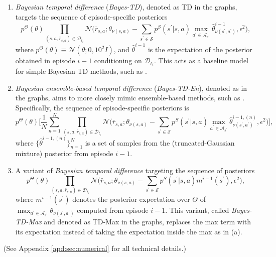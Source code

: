 \documentclass{amsart}
\begin{document}
\begin{enumerate}[label=(\alph*)]
    \item \textit{Bayesian temporal difference} (\textit{Bayes-TD}), denoted as TD in the graphs, targets the sequence of episode-specific posteriors
$$p^\Theta(\theta) \prod_{(s,a,\bar{r}_{s,a}) \in \mathcal{D}_{t_i}} \mathcal{N}\Big(\bar{r}_{s,a};\theta_{\nu(s,a)} - \sum_{s^\prime \in \mathcal{S}} p^S(s^\prime|s,a) \max_{a^\prime \in \mathcal{A}_{s^\prime}} \hat{\theta}^{i-1}_{\nu(s^\prime,a^\prime)}, \epsilon^2\Big),$$
where $p^\Theta(\theta)\equiv\mathcal{N}(\theta;0,10^2 I)$, and $\hat{\theta}^{i-1}$ is the expectation of the posterior obtained in episode $i-1$ conditioning on $\mathcal{D}_{t_i}$. This acts as a baseline model for simple Bayesian TD methods, such as \citet{dropout}.
    \item  \textit{Bayesian ensemble-based temporal difference} (\textit{Bayes-TD-En}), denoted as  in the graphs, aims to more closely mimic ensemble-based methods, such as \citet{bootstraposband,tdsmc}. Specifically, the sequence of episode-specific posteriors is
    $$p^\Theta(\theta)\Bigg[ \frac{1}{N}\sum_{n=1}^N \prod_{(s,a,\bar{r}_{s,a}) \in \mathcal{D}_{t_i}} \mathcal{N}\Big(\bar{r}_{s,a};\theta_{\nu(s,a)} - \sum_{s^\prime \in \mathcal{S}} p^S(s^\prime|s,a) \max_{a^\prime \in \mathcal{A}_{s^\prime}} \hat{\theta}^{i-1, (n)}_{\nu(s^\prime,a^\prime)}, \epsilon^2\Big) \Bigg],$$
    where $\{\hat{\theta}^{i-1, (n)}\}_{n=1}^N$ is a set of samples from the (truncated-Gaussian mixture) posterior from episode $i-1$. 
    \item A variant of \textit{Bayesian temporal difference} targeting the sequence of posteriors
     $$p^\Theta(\theta) \prod_{(s,a,\bar{r}_{s,a}) \in \mathcal{D}_{t_i}} \mathcal{N}\Big(\bar{r}_{s,a};\theta_{\nu(s,a)} - \sum_{s^\prime \in \mathcal{S}} p^S(s^\prime|s,a)  m^{i-1}(s^\prime), \epsilon^2\Big),$$
    where $m^{i-1}(s^\prime)$ denotes the posterior expectation over $\Theta$ of $\max_{a^\prime \in \mathcal{A}_{s^\prime}} \theta_{\nu(s^\prime,a^\prime)}$ computed from episode $i-1$. This variant, called {\it Bayes-TD-Max} and denoted as TD-Max in the graphs, replaces the max term with its expectation instead of taking the expectation inside the max as in (a).
\end{enumerate}

(See Appendix \ref{apd:sec:numerical} for all technical details.)
\end{document}
